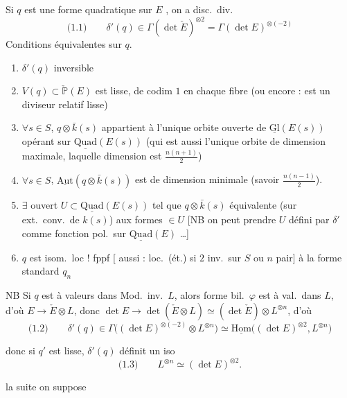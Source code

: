 \documentclass[11pt,a4paper]{article}
\begin{document}
Si $q$ est une forme quadratique sur $E$ , on a disc.\ div.
\[
  \text{(1.1)} \qquad \delta'(q) \in \Gamma(\det \check{E})^{\otimes 2}
  = \Gamma(\det E)^{\otimes(-2)}
\]
Conditions équivalentes sur $q$.
\begin{enumerate}
  \item[a)] $\delta'(q)$ inversible
  \item[b)] $V(q) \subset \check{\mathbb{P}}(E)$ est lisse, de codim $1$ en chaque
  fibre (ou encore : est un diviseur relatif lisse)
  \item[c)] $\forall s \in S$, $q \otimes \bar{k}(s)$ \struck{\ill{}} appartient à
  l'unique orbite ouverte de $\underline{\mathrm{Gl}}(E(s))$ opérant sur
   \struck{\ill{}} $\underline{\mathrm{Quad}}(E(s))$ (qui est aussi
  l'unique orbite de dimension maximale, laquelle dimension est
  $\frac{n(n+1)}{2}$)
  \item[d)] $\forall s \in S$, $\underline{\mathrm{Aut}}(q \otimes \bar{k}(s))$
  est de dimension minimale (savoir $\frac{n(n-1)}{2}$).
  \item[e')]  $\exists$ ouvert 
  \struck{\ill{}} $U \subset \underline{\mathrm{Quad}}(E(s))$ tel que
  $q \otimes \bar{k}(s)$ équivalente (sur ext.\ conv.\ de $k(s)$) aux formes
  $\in U$ [NB on peut prendre $U$ défini par $\delta'$  comme fonction pol.\ sur
  $\underline{\mathrm{Quad}}(E)$ …]
  \item[e)] $q$ est isom.\ loc ! fppf [ aussi :
  loc.\ (ét.) si $2$ inv.\ sur $S$ ou $n$ pair] à la forme standard $q_n$
\end{enumerate}

NB Si $q$ est à valeurs dans Mod.\ inv.\ $L$, alors forme bil.\ $\varphi$ est à
val.\ dans $L$, d'où $E \to \check{E} \otimes L$, donc
$\det E \to \det(\check{E} \otimes L) \simeq (\det \check{E}) \otimes L^{\otimes n}$, d'où
\[
  \text{(1.2)} \qquad \delta'(q) \in \Gamma\bigl((\det E)^{\otimes(-2)} \otimes L^{\otimes n}\bigr)
  \simeq \underline{\mathrm{Hom}}\bigl((\det E)^{\otimes 2}, L^{\otimes n}\bigr)
\]

donc si $q'$ est lisse, $\delta'(q)$ définit un iso
\[
  \text{(1.3)} \qquad L^{\otimes n} \simeq (\det E)^{\otimes 2} .
\]

 la suite on suppose \ill{} 
 
\end{document}
